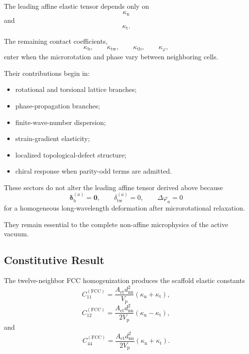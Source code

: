 The leading affine elastic tensor depends only on
\begin{equation}
    \kappa_{\mathrm{n}}
\end{equation}
and
\begin{equation}
    \kappa_{\mathrm{t}}.
\end{equation}

The remaining contact coefficients,
\begin{equation}
    \kappa_{\mathrm{b}}, \qquad \kappa_{\mathrm{tw}}, \qquad \kappa_{\mathrm{tb}}, \qquad \kappa_{\varphi},
\end{equation}
enter when the microrotation and phase vary between neighboring cells.

Their contributions begin in:
\begin{itemize}
    \item rotational and torsional lattice branches;
    \item phase-propagation branches;
    \item finite-wave-number dispersion;
    \item strain-gradient elasticity;
    \item localized topological-defect structure;
    \item chiral response when parity-odd terms are admitted.
\end{itemize}

These sectors do not alter the leading affine tensor derived above because
\begin{equation}
    \boldsymbol{\delta}_{\mathrm{b}}^{(a)} = \mathbf{0}, \qquad \delta_{\mathrm{tw}}^{(a)} = 0, \qquad \Delta\varphi_a = 0
\end{equation}
for a homogeneous long-wavelength deformation after microrotational relaxation.

They remain essential to the complete non-affine microphysics of the active vacuum.

\subsection{Constitutive Result}

The twelve-neighbor FCC homogenization produces the scaffold elastic constants
\begin{equation}
    \boxed{ C_{11}^{(\mathrm{FCC})} = \frac{ A_{\mathrm{ct}}d_{\mathrm{nn}}^2 }{ V_{\mathrm{p}} } \left( \kappa_{\mathrm{n}} + \kappa_{\mathrm{t}} \right), }
\end{equation}
\begin{equation}
    \boxed{ C_{12}^{(\mathrm{FCC})} = \frac{ A_{\mathrm{ct}}d_{\mathrm{nn}}^2 }{ 2V_{\mathrm{p}} } \left( \kappa_{\mathrm{n}} - \kappa_{\mathrm{t}} \right), }
\end{equation}
and
\begin{equation}
    \boxed{ C_{44}^{(\mathrm{FCC})} = \frac{ A_{\mathrm{ct}}d_{\mathrm{nn}}^2 }{ 2V_{\mathrm{p}} } \left( \kappa_{\mathrm{n}} + \kappa_{\mathrm{t}} \right). }
\end{equation}

